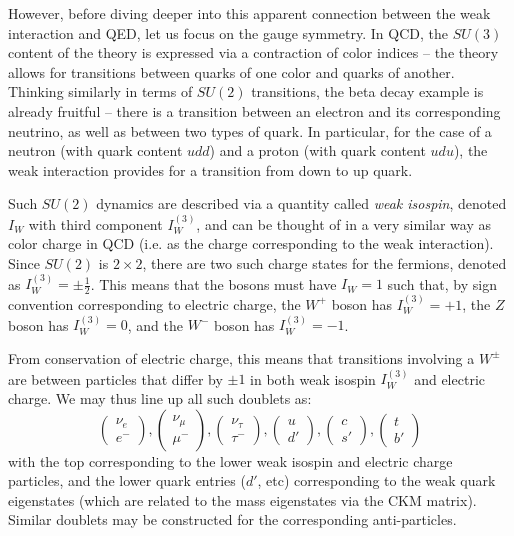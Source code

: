 However, before diving deeper into this apparent connection between the weak interaction and QED, let us focus on the
gauge symmetry. In QCD, the $SU(3)$ content of the theory is expressed via a contraction of color indices -- the theory 
allows for transitions between quarks of one color and quarks of another. Thinking similarly in terms of $SU(2)$ transitions,
the beta decay example is already fruitful -- there is a transition between an electron and its corresponding neutrino, 
as well as between two types of quark. In particular, for the case of a neutron (with quark content $udd$) and a proton 
(with quark content $udu$), the weak interaction provides for a transition from down to up quark.

Such $SU(2)$ dynamics are described via a quantity called \emph{weak isospin}, denoted $I_{W}$ with third component 
$I_{W}^{(3)}$, and can be thought of in a very similar way as color charge in QCD (i.e. as the charge corresponding to the 
weak interaction). Since $SU(2)$ is $2 \times 2$, there are two such charge states for the fermions, denoted as 
$I_{W}^{(3)}=\pm \frac{1}{2}$. This means that the bosons must have $I_{W} = 1$ such that, by sign convention corresponding 
to electric charge, the $W^{+}$ boson has $I_{W}^{(3)}=+1$, the $Z$ boson has $I_{W}^{(3)}=0$, and the $W^{-}$ boson has
$I_{W}^{(3)}=-1$.

From conservation of electric charge, this means that transitions involving a $W^{\pm}$ are between particles that differ by
$\pm 1$ in both weak isospin $I_{W}^{(3)}$ and electric charge. We may thus line up all such doublets as: 
\begin{equation}
\begin{pmatrix}\nu_{e} \\ e^{-}\end{pmatrix}, \begin{pmatrix}\nu_{\mu} \\ \mu^{-}\end{pmatrix}, 
\begin{pmatrix}\nu_{\tau} \\ \tau^{-}\end{pmatrix}, \begin{pmatrix}u \\ d'\end{pmatrix}, 
\begin{pmatrix}c \\ s'\end{pmatrix}, \begin{pmatrix}t \\ b'\end{pmatrix}
\end{equation}
with the top corresponding to the lower weak isospin and electric charge particles, and the lower quark entries 
($d'$, etc) corresponding to the weak quark eigenstates (which are related to the mass eigenstates via the CKM 
matrix). Similar doublets may be constructed for the corresponding anti-particles.

